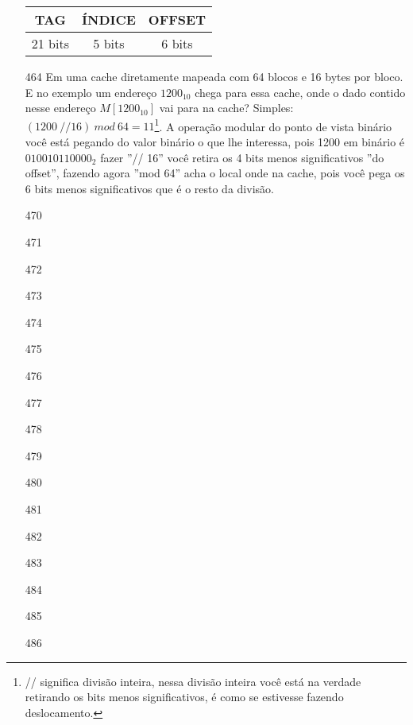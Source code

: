 \documentclass{article}
\begin{document}
\begin{enumerate}
\begin{table}[h]
  \centering
  \begin{tabular}{|c|c|c|}
    \hline TAG & ÍNDICE & OFFSET \\ 
    \hline 21 bits & 5 bits & 6 bits \\ 
    \hline 
  \end{tabular}
\end{table}

\item[464] Em uma cache diretamente mapeada com 64 blocos e 16 bytes por bloco.
E no exemplo um endereço $1200_{10}$ chega para essa cache, onde o dado contido
nesse endereço $M[1200_{10}]$ vai para na cache? Simples: $(1200\ // 16)\ mod\
64 = 11$\footnote{// significa divisão inteira, nessa divisão inteira você está
na verdade retirando os bits menos significativos, é como se estivesse fazendo
deslocamento.}. A operação modular do ponto de vista binário você está pegando
do valor binário o que lhe interessa, pois 1200 em binário é $010010110000_{2}$
fazer ''// 16'' você retira os 4 bits menos significativos ''do offset'',
fazendo agora ''mod 64'' acha o local onde na cache, pois você pega os 6 bits
menos significativos que é o resto da divisão.

\item[470]
\item[471]
\item[472]
\item[473]
\item[474]
\item[475]
\item[476]
\item[477]
\item[478]
\item[479]
\item[480]
\item[481]
\item[482]
\item[483]
\item[484]
\item[485]
\item[486]
\end{enumerate}
\end{document}
